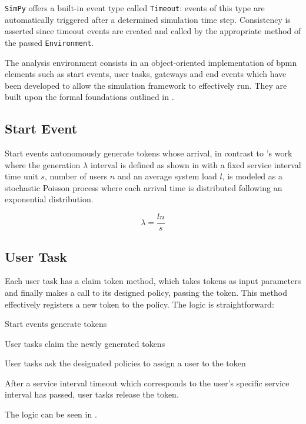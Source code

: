 \texttt{SimPy} offers a built-in event type called \texttt{Timeout}: events of this type are automatically triggered after a determined simulation time step. Consistency is asserted since timeout events are created and called by the appropriate method of the passed \texttt{Environment}.

The analysis environment consists in an object-oriented implementation of \gls{bpmn} elements such as start events, user tasks, gateways and end events which have been developed to allow the simulation framework to effectively run. They are built upon the formal foundations outlined in .

\subsection{Start Event}
\label{subsec:start_event}

Start events autonomously generate tokens whose arrival, in contrast to \citet{Zeng2005}'s work where the generation $\lambda$ interval is defined as shown in  with a fixed service interval time unit $s$, number of users $n$ and an average system load $l$, is modeled as a stochastic Poisson process where each arrival time is distributed following an exponential distribution. 

\begin{equation}
\label{eq:generation_interval}
	\lambda = \frac{l n}{s}
\end{equation}

\subsection{User Task}
\label{subsec:user_task}

Each user task has a claim token method, which takes tokens as input parameters and finally makes a call to its designed policy, passing the token. This method effectively registers a new token to the policy. The logic is straightforward: 
\begin{enumerate*}
    \item Start events generate tokens
    \item User tasks claim the newly generated tokens
    \item User tasks ask the designated policies to assign a user to the token
    \item After a service interval timeout which corresponds to the user's specific service interval has passed, user tasks release the token.
\end{enumerate*}
The logic can be seen in .

